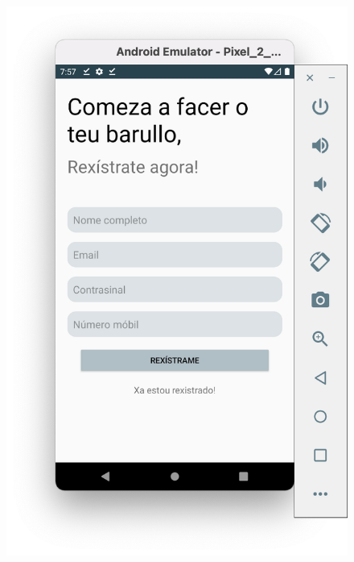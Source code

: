 \documentclass[a4paper,12pt]{article}
\begin{document}
\begin{figure}[H]
	\centering
	\includegraphics[scale=.42]{8.png}
\end{figure}
\end{document}
